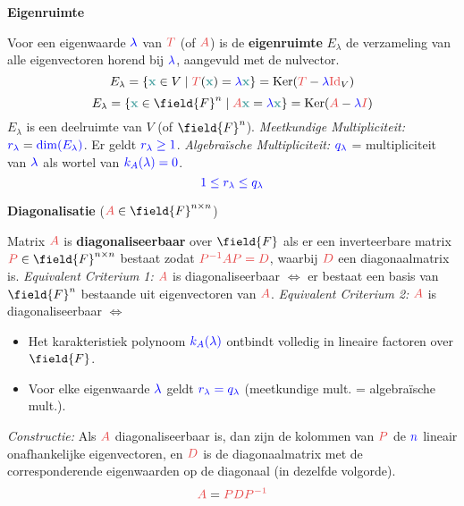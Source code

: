 \documentclass[12pt]{article}
\renewcommand{\vec}[1]{\textcolor{vectorTeal}{\mathbf{#1}}}
\newcommand{\scalar}[1]{\textcolor{scalarBrightBlue}{#1}}
\newcommand{\mat}[1]{\textcolor{matrixSoftRed}{#1}}
\DeclareMathOperator{\Ker}{Ker}
\DeclareMathOperator{\Dim}{dim}
\newcommand{\Id}{\mat{\mathrm{Id}}}
\newcommand{\matI}{\mat{I}} %
\begin{document}
\vspace{1.5em} %
{\centering
\textcolor{headerBrown}{\large\textbf{Eigenruimte}}
\par
}%
Voor een eigenwaarde $\scalar{\lambda}$ van $\mat{T}$ (of $\mat{A}$) is de \textbf{eigenruimte} $E_\lambda$ de verzameling van alle eigenvectoren horend bij $\scalar{\lambda}$, aangevuld met de nulvector.
\[
E_\lambda = \{ \vec{x} \in V \mid \mat{T}(\vec{x}) = \scalar{\lambda} \vec{x} \} = \Ker(\mat{T} - \scalar{\lambda} \Id_V)
\]
\[
E_\lambda = \{ \vec{x} \in \field{F}^n \mid \mat{A} \vec{x} = \scalar{\lambda} \vec{x} \} = \Ker(\mat{A} - \scalar{\lambda} \matI)
\]
$E_\lambda$ is een deelruimte van $V$ (of $\field{F}^n$).
\textit{Meetkundige Multipliciteit:} $\scalar{r_\lambda} = \scalar{\Dim(E_\lambda)}$. Er geldt $\scalar{r_\lambda \ge 1}$.
\textit{Algebraïsche Multipliciteit:} $\scalar{q_\lambda}$ = multipliciteit van $\scalar{\lambda}$ als wortel van $\scalar{k_A(\lambda)=0}$.
\[
\scalar{1 \le r_\lambda \le q_\lambda}
\]

\vspace{1.5em} %
{\centering
\textcolor{headerBrown}{\large\textbf{Diagonalisatie}} ($\mat{A} \in \field{F}^{n \times n}$)
\par
}%
Matrix $\mat{A}$ is \textbf{diagonaliseerbaar} over $\field{F}$ als er een inverteerbare matrix $\mat{P} \in \field{F}^{n \times n}$ bestaat zodat $\mat{P^{-1} A P = D}$, waarbij $\mat{D}$ een diagonaalmatrix is.
\textit{Equivalent Criterium 1:} $\mat{A}$ is diagonaliseerbaar $\iff$ er bestaat een basis van $\field{F}^n$ bestaande uit eigenvectoren van $\mat{A}$.
\textit{Equivalent Criterium 2:} $\mat{A}$ is diagonaliseerbaar $\iff$
\begin{itemize}
    \item Het karakteristiek polynoom $\scalar{k_A(\lambda)}$ ontbindt volledig in lineaire factoren over $\field{F}$.
    \item Voor elke eigenwaarde $\scalar{\lambda}$ geldt $\scalar{r_\lambda = q_\lambda}$ (meetkundige mult. = algebraïsche mult.).
\end{itemize}
\textit{Constructie:} Als $\mat{A}$ diagonaliseerbaar is, dan zijn de kolommen van $\mat{P}$ de $\scalar{n}$ lineair onafhankelijke eigenvectoren, en $\mat{D}$ is de diagonaalmatrix met de corresponderende eigenwaarden op de diagonaal (in dezelfde volgorde).
\[
\mat{A} = \mat{P D P^{-1}}
\]
\end{document}
